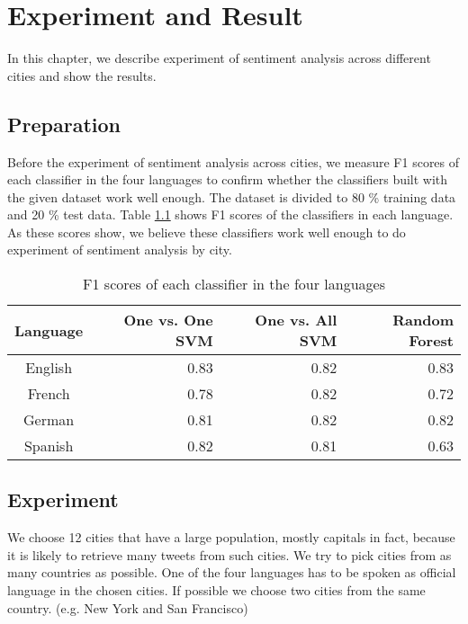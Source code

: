 \chapter{Experiment and Result}
In this chapter, we describe experiment of sentiment analysis across different cities and show the results.
\section{Preparation}
Before the experiment of sentiment analysis across cities, we measure F1 scores of each classifier in the four languages to confirm whether the classifiers built with the given dataset work well enough.
The dataset is divided to 80 \% training data and 20 \% test data.
Table \ref{tab:f1score} shows F1 scores of the classifiers in each language.
As these scores show, we believe these classifiers work well enough to do experiment of sentiment analysis by city.


\begin{table}[ht]
	\caption{F1 scores of each classifier in the four languages}
	\begin{tabular}{|c|r|r|r|} \hline
	Language&One vs. One SVM &One vs. All SVM &Random Forest\\ \hline \hline
	English & 0.83 & 0.82 & 0.83  \\ \hline
	French & 0.78 & 0.82 & 0.72  \\ \hline
	German & 0.81 & 0.82 & 0.82 \\ \hline
	Spanish & 0.82 & 0.81 & 0.63  \\ \hline
	\end{tabular}
	\label{tab:f1score}
\end{table}

\section{Experiment}

We choose 12 cities that have a large population, mostly capitals in fact, because it is likely to retrieve many tweets from such cities.
We try to pick cities from as many countries as possible.
One of the four languages has to be spoken as official language in the chosen cities.
If possible we choose two cities from the same country. (e.g. New York and San Francisco)

